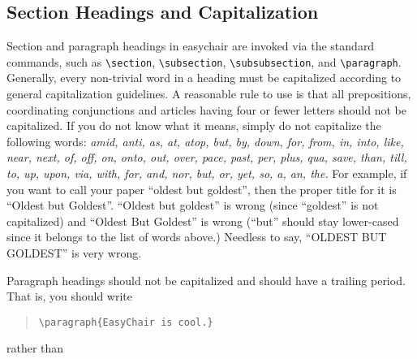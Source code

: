 \documentclass[withtimes]{easychair}
\newcommand{\easychair}{\textsf{easychair}}
\begin{document}

\subsection{Section Headings and Capitalization}
\label{sect:section-headings}

Section and paragraph headings in {\easychair} are invoked via the standard 
commands, such as
\verb+\section+,
\verb+\subsection+,
\verb+\subsubsection+, and
\verb+\paragraph+.
Generally, every non-trivial word in a heading must be capitalized according to
general capitalization guidelines. A reasonable rule to use is that
all prepositions, coordinating conjunctions and articles having four
or fewer letters should not be capitalized. If you do not know what it
means, simply do not capitalize the following words:
\textit{amid, anti, as, at, atop, but, by, down, for, from, in, into, like,
near, next, of, off, on, onto, out, over, pace, past, per, plus, qua,
save, than, till, to, up, upon, via, with, for, and, nor, but, or,
yet, so, a, an, the.} For example, if you want to call your paper
``oldest but goldest'', then the proper title for it is ``Oldest but
Goldest''. ``Oldest but goldest'' is wrong (since ``goldest'' is not
capitalized) and ``Oldest But Goldest'' is wrong (``but'' should stay
lower-cased since it belongs to the list of words above.) Needless to
say, ``OLDEST BUT GOLDEST'' is very wrong.

Paragraph headings should not be capitalized and should have a
trailing period. That is, you should write

\begin{quote}
\verb|\paragraph{EasyChair is cool.}|
\end{quote}
rather than 
\end{document}

